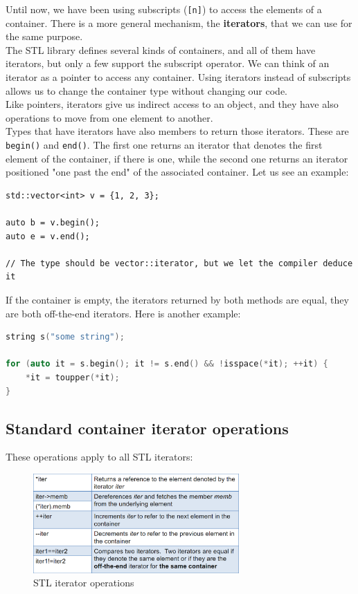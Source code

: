 Until now, we have been using subscripts (\texttt{[n]}) to access the elements of
a container. There is a more general mechanism, the \textbf{iterators}, that we can
use for the same purpose.\\

The STL library defines several kinds of containers, and all of them have iterators,
but only a few support the subscript operator. We can think of an iterator as a 
pointer to access any container. Using iterators instead of subscripts allows us to
change the container type without changing our code.\\

Like pointers, iterators give us indirect access to an object, and they have also
operations to move from one element to another.\\

Types that have iterators have also members to return those iterators. These are
\texttt{begin()} and \texttt{end()}. The first one returns an iterator that denotes the
first element of the container, if there is one, while the second one returns an 
iterator positioned "one past the end" of the associated container. Let us see
an example:\\

\begin{lstlisting}
std::vector<int> v = {1, 2, 3};

auto b = v.begin();
auto e = v.end();

// The type should be vector::iterator, but we let the compiler deduce it
\end{lstlisting}

If the container is empty, the iterators returned by both methods are equal,
they are both off-the-end iterators. Here is another example:\\

\begin{lstlisting}[language=C++]
string s("some string");

for (auto it = s.begin(); it != s.end() && !isspace(*it); ++it) {
    *it = toupper(*it);
}
\end{lstlisting}

\subsection{Standard container iterator operations}

These operations apply to all STL iterators:

\begin{figure}[H]
\centering
\includegraphics[width=0.7\textwidth]{figures/image_STL_it_op.png}
\caption{STL iterator operations}
\label{fig:STL_it_op}
\end{figure}

